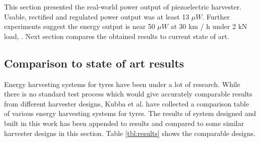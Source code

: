This section presented the real-world power output of piezoelectric harvester. Usable, rectified and regulated power output was at least 13 $\mu W$. Further experiments suggest the energy output is near 50 $\mu W$ at 30 km / h under 2 kN load, . Next section compares the obtained results to current state of art.

\subsection{Comparison to state of art results}\label{sect:state-of-art}
Energy harvesting systems for tyres have been under a lot of research. While there is no standard test process which would give accurately comparable results from different harvester designs, Kubba et al. \cite{Kubba2014} have 
collected a comparison table of various energy harvesting systems for tyres. The results of system designed and built in this work has been appended to results and compared to some similar harvester designs in this section. Table \ref{tbl:results} shows the comparable designs.

\begin{table}[htb]
\caption{\label{tbl:results} The designed system compared to current state of art tyre energy harvester results \cite{Kubba2014}.}
\begin{center}
\end{center}
\end{table}

